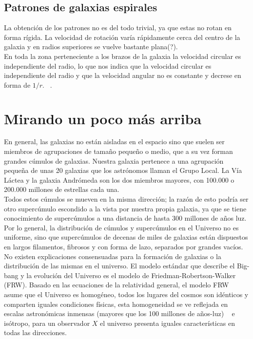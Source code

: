 \documentclass[12tp]{article}
\begin{document}
\subsection{Patrones de galaxias espirales}
La obtención de los patrones no es  del todo trivial, ya que estas no rotan en forma rígida.
La velocidad de rotación varía rápidamente cerca del centro de la galaxia y en radios superiores se vuelve bastante 
plana(?).\\[0.2cm] En toda la zona perteneciente a los brazos de la galaxia la velocidad circular es independiente del radio, lo que nos indica 
que la velocidad circular es independiente del radio y que la velocidad angular no es constante y decrese en forma de $1/r$.
~\cite{Schulman}.
  
\section{Mirando un poco más arriba}
En general, las galaxias no están aisladas en el espacio sino que suelen ser miembros de agrupaciones de tamaño pequeño o medio, que 
a su vez forman grandes cúmulos de galaxias. Nuestra galaxia pertenece a una agrupación pequeña de unas 20 galaxias que los astrónomos 
llaman el Grupo Local. La Vía Láctea y la galaxia Andrómeda son los dos miembros mayores, con 100.000 o 200.000 millones de estrellas 
cada una.\\[0.2cm]
Todos estos cúmulos se mueven en la misma dirección; la razón de esto podría ser otro supercúmulo escondido a la vista por nuestra propia 
galaxia, ya que se tiene conocimiento de supercúmulos a una distancia de hasta 300 millones de años luz. 
Por lo general, la distribución de cúmulos y supercúmulos en el Universo no es uniforme, sino que supercúmulos de decenas de miles 
de galaxias están dispuestos en largos filamentos, fibrosos y con forma de lazo, separados por grandes vacíos.\\[0.2cm]
No existen explicaciones consensuadas para la formación de galaxias o la distribución de las mismas en el universo. El modelo estándar 
que describe el Big-bang y la evolución del Universo es el modelo de Friedman-Robertson-Walker (FRW). Basado en las ecuaciones de la 
relatividad general, el modelo FRW asume que el Universo es homogéneo, todos los lugares del cosmos son idénticos y comparten iguales 
condiciones físicas, esta homogeneidad se ve reflejada en escalas astronómicas inmensas (mayores que los 100 millones de años-luz) ~\cite{Gangui2009}
e isótropo, para un observador $X$ el universo presenta iguales características en todas las direcciones. 
\end{document}
